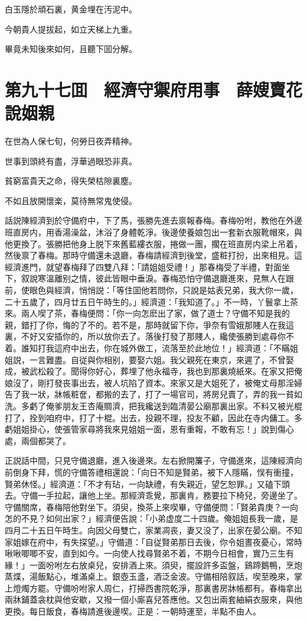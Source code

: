 白玉隱於頑石裏，黄金埋在汚泥中。

今朝貴人提拔起，如立天梯上九重。

畢竟未知後來如何，且聽下囬分解。

\chapter*{第九十七囬　經濟守禦府用事　薛嫂賣花說姻親}

在世為人保七旬，何勞日夜弄精神。

世事到頭終有盡，浮華過眼恐非真。

貧窮富貴天之命，得失榮枯隙裏塵。

不如且放開懷楽，莫待無常鬼使侵。

話説陳經濟到於守備府中，下了馬，張勝先進去禀報春梅。春梅吩咐，教他在外邊班直房内，用香湯澡盆，沐浴了身體乾淨。後邊使養娘包出一套新衣服靴帽來，與他更換了。張勝把他身上脱下來舊藍縷衣服，捲做一團，擱在班直房内梁上吊着，然後禀了春梅。那時守備還未退廳，春梅請經濟到後堂，盛粧打扮，出來相見。這經濟進門，就望春梅拜了四雙八拜：「請姐姐受禮！」那春梅受了半禮，對面坐下，叙說寒溫離别之情，彼此皆眼中垂淚。春梅恐怕守備退廳進來，見無人在跟前，使眼色與經濟，悄悄説：「等住囬他若問你，只說是姑表兄弟，我大你一歲，二十五歲了，四月廿五日午時生的。」經濟道：「我知道了。」不一時，丫鬟拿上茶來。兩人喫了茶，春梅便問：「你一向怎麽出了家，做了道士？守備不知是我的親，錯打了你，悔的了不的。若不是，那時就留下你，爭奈有雪娥那賤人在我這裏，不好又安插你的，所以放你去了。落後打發了那賤人，纔使張勝到處尋你不着。誰知打我這府中出去，你在城外做工，流落至於此地位！」經濟道：「不瞞姐姐説，一言難盡。自従與你相别，要娶六姐。我父親死在東京，來遲了，不曾娶成，被武松殺了。聞得你好心，葬埋了他永福寺，我也到那裏燒紙來。在家又把俺娘沒了，剛打發丧事出去，被人坑陷了資本。來家又是大姐死了，被俺丈母那淫婦告了我一狀，牀帳粧奩，都搬的去了，打了一場官司，將房兒賣了，弄的我一貧如洗。多虧了俺爹朋友王杏庵賙濟，把我纔送到臨清晏公廟那裏出家。不料又被光棍打了，拴到咱府中，打了十棍。出去，投親不理，投友不顧，因此在寺内傭工。多虧姐姐掛心，使張管家尋將我來見姐姐一面，恩有重報，不敢有忘！」說到傷心處，兩個都哭了。

正説話中間，只見守備退廳，進入後邊來。左右掀開簾子，守備進來，這陳經濟向前倒身下拜，慌的守備答禮相還說：「向日不知是賢弟，被下人隱瞞，悮有衝撞，賢弟休怪。」經濟道：「不才有玷，一向缺禮，有失親近，望乞恕罪。」又磕下頭去。守備一手拉起，讓他上坐。那經濟乖覺，那裏肯，務要拉下椅兒，旁邊坐了。守備關席，春梅陪他對坐下。須臾，換茶上來喫畢，守備便問：「賢弟貴庚？一向怎的不見？如何出家？」經濟便告說：「小弟虚度二十四歲。俺姐姐長我一歲，是四月二十五日午時生。向因父母雙亡，家業凋丧，妻又没了，出家在晏公廟。不知家姐嫁在府中，有失探望。」守備道：「自従賢弟那日去後，你令姐晝夜憂心，常時啾啾唧唧不安，直到如今。一向使人找尋賢弟不着，不期今日相會，實乃三生有緣！」一面吩咐左右放桌兒，安排酒上來。須臾，擺設許多盃盤，鷄蹄鵝鴨，烹炮蒸煠，湯飯點心，堆滿桌上。銀壺玉盞，酒泛金波。守備相陪叙話，喫至晚來，掌上燈燭方罷。守備吩咐家人周仁，打掃西書院乾淨，那裏書房牀帳都有。春梅拿出兩牀鋪蓋衾枕與他安歇，又撥一個小廝喜兒答應他。又包出兩套紬絹衣服來，與他更換。每日飯食，春梅請進後邊喫。正是：一朝時運至，半點不由人。

